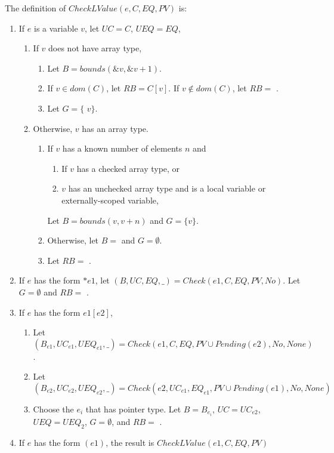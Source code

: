 The definition of $CheckLValue(e, C, EQ, PV)$ is:
\begin{enumerate}
\item If $e$ is a variable $v$, let $UC = C$, $UEQ=EQ$,
\begin{enumerate}
\item If $v$ does not have array type,
\begin{enumerate}
\item Let $B = bounds(\&v,\&v + 1)$.
\item If $v \in dom(C)$, let $RB = C[v]$.  If $v \notin dom(C)$, let $RB =$ \boundsunknown.
\item Let $G=\{$ \code{&}$v \}$.
\end{enumerate}
\item Otherwise, $v$ has an array type.
\begin{enumerate}
\item If $v$ has a known number of elements $n$ and
\begin{enumerate}
\item If $v$ has a checked array type, or
\item $v$ has an unchecked array type and is a local variable or externally-scoped variable,
\end{enumerate}
Let $B = bounds(v, v + n)$ and $G =\{ v \}$.
\item Otherwise, let $B = $ \boundsunknown and $G = \emptyset$.
\item Let $RB = $ \boundsunknown.
\end{enumerate}
\end{enumerate}
\item If $e$ has the form $*e1$,  let $(B, UC, EQ, \_) = Check(e1, C, EQ, PV, No)$.  Let $G =\emptyset$ and $RB = $ \boundsunknown.
\item If $e$ has the form $e1[e2]$,
\begin{enumerate}
\item Let $(B_{e1}, {UC}_{e1}, {UEQ}_{e1}, \_) = Check(e1, C, EQ, PV \cup Pending(e2), No, 
         None)$.
\item Let $(B_{e2}, {UC}_{e2}, {UEQ}_{e2}, \_) = Check(e2, {UC}_{e1}, {EQ}_{e1},
         PV \cup Pending(e1), No, None)$
\item Choose the $e_i$ that has pointer type.   Let $B = B_{e_i}$, $UC = {UC}_{e2}$, 
$UEQ  = {UEQ}_2$,  $G=\emptyset$, and $RB = $ \boundsunknown.
\end{enumerate}
\item If $e$ has the form $(e1)$, the result is $CheckLValue(e1, C, EQ, PV)$
\end{enumerate}

